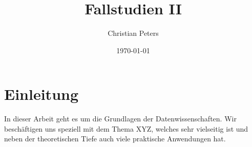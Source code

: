 \documentclass[a4paper,12pt]{article}
\title{Fallstudien II}
\author{Christian Peters}
\date{\today}
\begin{document}
\maketitle
\thispagestyle{empty}

\newpage
\tableofcontents
\thispagestyle{empty}

\newpage

\setcounter{page}{1}

\section{Einleitung}
In dieser Arbeit geht es um die Grundlagen der Datenwissenschaften. 
Wir beschäftigen uns speziell mit dem Thema XYZ,
welches sehr vielseitig ist und neben der theoretischen Tiefe auch viele praktische Anwendungen hat.

\newpage

\nocite{XGBoost, IEEE}


\end{document}
